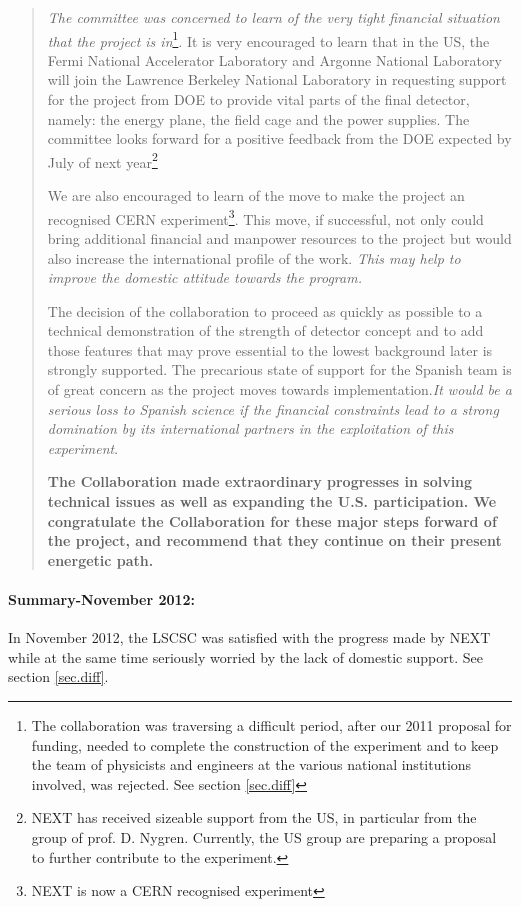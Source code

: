 \begin{quotation}
{\em The committee was concerned to learn of the very tight financial situation that the project is in}\footnote{The collaboration was traversing a difficult period, after our 2011 proposal for funding, needed to complete the construction of the experiment and to keep the team of physicists and engineers at the various national institutions involved, was rejected. See section \ref{sec.diff}}. It is very encouraged to learn that in the US, the Fermi National Accelerator Laboratory and Argonne National Laboratory will join the Lawrence Berkeley National Laboratory in requesting support for the project from DOE to provide vital parts of the final detector, namely: the energy plane, the field cage and the power supplies. The committee looks forward for a positive feedback from the DOE expected by July of next year\footnote{NEXT has received sizeable support from the US, in particular from the group of prof. D. Nygren. Currently, the US group are preparing a proposal to further contribute to the experiment.}

We are also encouraged to learn of the move to make the project an recognised CERN experiment\footnote{NEXT is now a CERN recognised experiment}. This move, if successful, not only could bring additional financial and manpower resources to the project but would also increase the international profile of the work. {\em This may help to improve the domestic attitude towards the program. }

The decision of the collaboration to proceed as quickly as possible to a technical demonstration of the strength of detector concept and to add those features that may prove essential to the lowest background later is strongly supported. The precarious state of support for the Spanish team is of great concern as the project moves towards implementation.{\em  It would be a serious loss to Spanish science if the financial constraints lead to a strong domination by its international partners in the exploitation of this experiment}.

{\bf
The Collaboration made extraordinary progresses in solving technical issues as well as expanding the U.S. participation. We congratulate the Collaboration for these major steps forward of the project, and recommend that they continue on their present energetic path. 
}

\end{quotation}

\paragraph{Summary-November 2012:} In November 2012, the LSCSC was satisfied with the progress made by 
NEXT while at the same time seriously worried by the lack of domestic support. See section \ref{sec.diff}.

